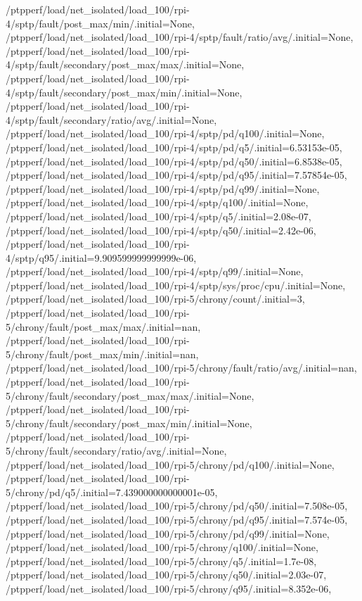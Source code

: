 {    /ptpperf/load/net_isolated/load_100/rpi-4/sptp/fault/post_max/min/.initial=None,
    /ptpperf/load/net_isolated/load_100/rpi-4/sptp/fault/ratio/avg/.initial=None,
    /ptpperf/load/net_isolated/load_100/rpi-4/sptp/fault/secondary/post_max/max/.initial=None,
    /ptpperf/load/net_isolated/load_100/rpi-4/sptp/fault/secondary/post_max/min/.initial=None,
    /ptpperf/load/net_isolated/load_100/rpi-4/sptp/fault/secondary/ratio/avg/.initial=None,
    /ptpperf/load/net_isolated/load_100/rpi-4/sptp/pd/q100/.initial=None,
    /ptpperf/load/net_isolated/load_100/rpi-4/sptp/pd/q5/.initial=6.53153e-05,
    /ptpperf/load/net_isolated/load_100/rpi-4/sptp/pd/q50/.initial=6.8538e-05,
    /ptpperf/load/net_isolated/load_100/rpi-4/sptp/pd/q95/.initial=7.57854e-05,
    /ptpperf/load/net_isolated/load_100/rpi-4/sptp/pd/q99/.initial=None,
    /ptpperf/load/net_isolated/load_100/rpi-4/sptp/q100/.initial=None,
    /ptpperf/load/net_isolated/load_100/rpi-4/sptp/q5/.initial=2.08e-07,
    /ptpperf/load/net_isolated/load_100/rpi-4/sptp/q50/.initial=2.42e-06,
    /ptpperf/load/net_isolated/load_100/rpi-4/sptp/q95/.initial=9.909599999999999e-06,
    /ptpperf/load/net_isolated/load_100/rpi-4/sptp/q99/.initial=None,
    /ptpperf/load/net_isolated/load_100/rpi-4/sptp/sys/proc/cpu/.initial=None,
    /ptpperf/load/net_isolated/load_100/rpi-5/chrony/count/.initial=3,
    /ptpperf/load/net_isolated/load_100/rpi-5/chrony/fault/post_max/max/.initial=nan,
    /ptpperf/load/net_isolated/load_100/rpi-5/chrony/fault/post_max/min/.initial=nan,
    /ptpperf/load/net_isolated/load_100/rpi-5/chrony/fault/ratio/avg/.initial=nan,
    /ptpperf/load/net_isolated/load_100/rpi-5/chrony/fault/secondary/post_max/max/.initial=None,
    /ptpperf/load/net_isolated/load_100/rpi-5/chrony/fault/secondary/post_max/min/.initial=None,
    /ptpperf/load/net_isolated/load_100/rpi-5/chrony/fault/secondary/ratio/avg/.initial=None,
    /ptpperf/load/net_isolated/load_100/rpi-5/chrony/pd/q100/.initial=None,
    /ptpperf/load/net_isolated/load_100/rpi-5/chrony/pd/q5/.initial=7.439000000000001e-05,
    /ptpperf/load/net_isolated/load_100/rpi-5/chrony/pd/q50/.initial=7.508e-05,
    /ptpperf/load/net_isolated/load_100/rpi-5/chrony/pd/q95/.initial=7.574e-05,
    /ptpperf/load/net_isolated/load_100/rpi-5/chrony/pd/q99/.initial=None,
    /ptpperf/load/net_isolated/load_100/rpi-5/chrony/q100/.initial=None,
    /ptpperf/load/net_isolated/load_100/rpi-5/chrony/q5/.initial=1.7e-08,
    /ptpperf/load/net_isolated/load_100/rpi-5/chrony/q50/.initial=2.03e-07,
    /ptpperf/load/net_isolated/load_100/rpi-5/chrony/q95/.initial=8.352e-06,
}
